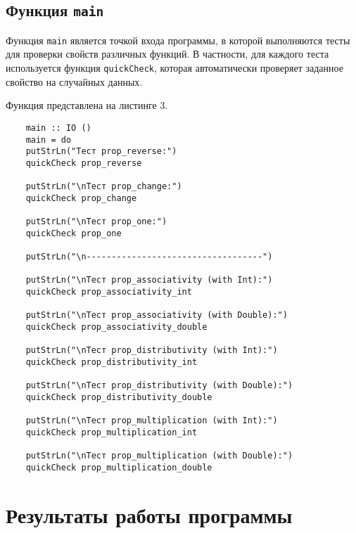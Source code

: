 \documentclass[10pt,a4paper,final]{article} %
\begin{document}
\subsection{Функция \texttt{main}}

Функция \texttt{main} является точкой входа программы, в которой выполняются тесты для проверки свойств различных функций. В частности, для каждого теста используется функция \texttt{quickCheck}, которая автоматически проверяет заданное свойство на случайных данных.

Функция представлена на листинге 3.

\begin{lstlisting}
	main :: IO ()
	main = do
	putStrLn("Тест prop_reverse:")
	quickCheck prop_reverse
	
	putStrLn("\nТест prop_change:")
	quickCheck prop_change
	
	putStrLn("\nТест prop_one:")
	quickCheck prop_one
	
	putStrLn("\n-----------------------------------")
	
	putStrLn("\nТест prop_associativity (with Int):")
	quickCheck prop_associativity_int 
	
	putStrLn("\nТест prop_associativity (with Double):")
	quickCheck prop_associativity_double
	
	putStrLn("\nТест prop_distributivity (with Int):")
	quickCheck prop_distributivity_int 
	
	putStrLn("\nТест prop_distributivity (with Double):")
	quickCheck prop_distributivity_double
	
	putStrLn("\nТест prop_multiplication (with Int):")
	quickCheck prop_multiplication_int 
	
	putStrLn("\nТест prop_multiplication (with Double):")
	quickCheck prop_multiplication_double
\end{lstlisting}

\newpage
\section{Результаты работы программы}
\end{document}
